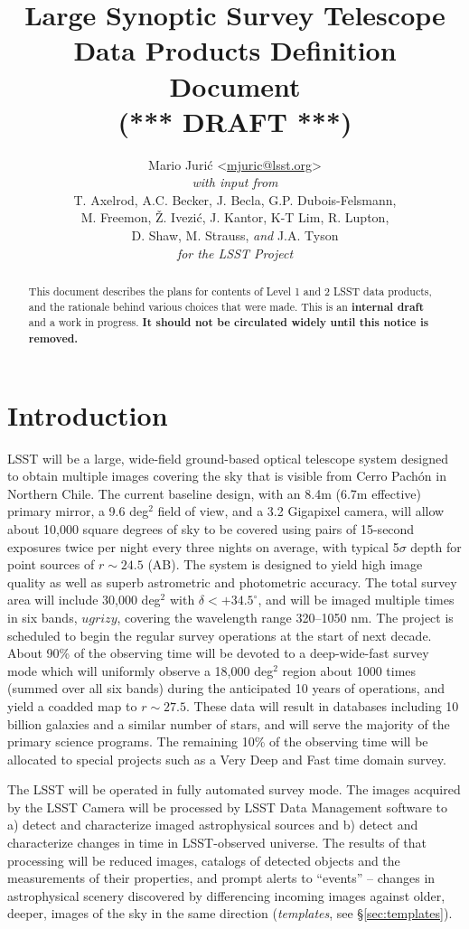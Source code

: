 \documentclass[12pt]{article}
\title{Large Synoptic Survey Telescope \\
Data Products Definition Document \\
(*** DRAFT ***)}
\author{
    Mario Juri\'c \textless\href{mailto:mjuric@lsst.org}{mjuric@lsst.org}\textgreater \vspace{1ex} \\
    {\em with input from} \vspace{1ex} \\
    T. Axelrod, A.C. Becker, J. Becla,  G.P. Dubois-Felsmann, \\
    M. Freemon, \v{Z}. Ivezi\'c, J. Kantor, K-T Lim, R. Lupton, \\
    D. Shaw, M. Strauss, {\em and} J.A. Tyson \vspace{1.2ex} \\
    {\em for the LSST Project}
}
\newcommand{\B}[1]{{#1}}
\newcommand{\R}[1]{{\color{red}}}
\begin{document}
\maketitle

\begin{abstract}
This document describes the plans for contents of Level 1 and 2 LSST data products, and the rationale behind various choices that were made. This is an {\bf internal draft} and a work in progress. {\bf It should not be circulated widely until this notice is removed.}
\end{abstract}

\tableofcontents

\section{Introduction}

LSST will be a large, wide-field ground-based optical telescope system
designed to obtain multiple images covering the sky that is visible from Cerro Pach\'{o}n in Northern Chile. The current baseline design, with an 8.4m (6.7m effective) primary mirror, a 9.6 deg$^2$ field of view, and a 3.2 Gigapixel camera, will allow about 10,000 square degrees of sky to be covered using pairs  of 15-second exposures \R{in two photometric bands} \B{twice per night} every three nights on average, with typical 5$\sigma$ depth for point sources of $r\sim24.5$ (AB). The system is designed to yield high image quality as well as superb astrometric  and photometric accuracy. The \B{total} survey area will include 30,000 deg$^2$ with $\delta<+34.5^\circ$, and will be imaged multiple times in six bands, $ugrizy$, covering the wavelength range 320--1050 nm. The project is scheduled to  begin the regular survey operations at the start of next decade. About 90\% of the observing time will be devoted to a deep-wide-fast survey mode which will \B{uniformly} observe a 18,000 deg$^2$ region about 1000 times (summed over all six bands) during the anticipated 10 years of operations, and yield a coadded map to $r\sim27.5$. These data will result in databases including 10 billion galaxies and a similar number of stars, and will serve the majority of the primary science programs. The remaining 10\% of the observing time will be allocated to special projects such as a Very Deep and Fast time domain survey.

The LSST will be operated in fully automated survey mode. The images acquired by the LSST Camera will be processed by LSST Data Management software to a) detect and characterize imaged astrophysical sources and b) detect and characterize changes in time in LSST-observed universe. The results of that processing will be reduced images, catalogs of detected objects and the measurements of their properties, and prompt alerts to ``events'' -- changes in astrophysical scenery discovered by differencing incoming images against older, deeper, images of the sky in the same direction ({\em templates}, see \S \ref{sec:templates}).
\end{document}
